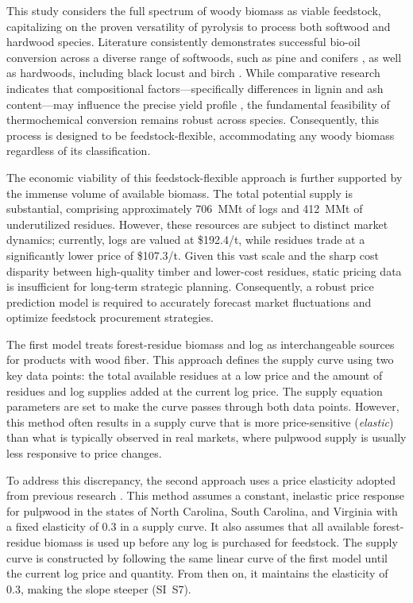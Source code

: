This study considers the full spectrum of woody biomass as viable feedstock, capitalizing on the proven versatility of pyrolysis to process both softwood and hardwood species. Literature consistently demonstrates successful bio-oil conversion across a diverse range of softwoods, such as pine and conifers \citep{tran2021fast, jarvis2014characterization}, as well as hardwoods, including black locust and birch \citep{straker2015black, li2014autothermal}. While comparative research indicates that compositional factors—specifically differences in lignin and ash content—may influence the precise yield profile \citep{garcia2007vacuum, azeez2010fast}, the fundamental feasibility of thermochemical conversion remains robust across species. Consequently, this process is designed to be feedstock-flexible, accommodating any woody biomass regardless of its classification.

The economic viability of this feedstock-flexible approach is further supported by the immense volume of available biomass. The total potential supply is substantial, comprising approximately 706~MMt of logs and 412~MMt of underutilized residues. However, these resources are subject to distinct market dynamics; currently, logs are valued at \$192.4/t, while residues trade at a significantly lower price of \$107.3/t. Given this vast scale and the sharp cost disparity between high-quality timber and lower-cost residues, static pricing data is insufficient for long-term strategic planning. Consequently, a robust price prediction model is required to accurately forecast market fluctuations and optimize feedstock procurement strategies.

The first model treats forest-residue biomass and log as interchangeable sources for products with wood fiber. 
This approach defines the supply curve using two key data points: the total available residues at a low price and the amount of residues and log supplies added at the current log price. 
The supply equation parameters are set to make the curve passes through both data points. 
However, this method often results in a supply curve that is more price-sensitive (\textit{elastic}) than what is typically observed in real markets, where pulpwood supply is usually less responsive to price changes. 

To address this discrepancy, the second approach uses a price elasticity adopted from previous research \citep{galik2009forest}.
This method assumes a constant, inelastic price response for pulpwood in the states of North Carolina, South Carolina, and Virginia with a fixed elasticity of 0.3 in a supply curve. 
It also assumes that all available forest-residue biomass is used up before any log is purchased for feedstock. 
The supply curve is constructed by following the same linear curve of the first model until the current log price and quantity. 
From then on, it maintains the elasticity of 0.3, making the slope steeper (SI~S7). 

